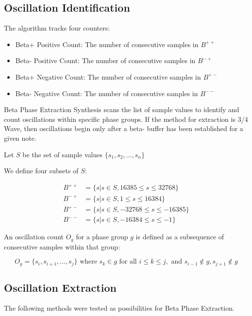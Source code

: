 \documentclass[12pt,a4paper]{article}
\begin{document}
\subsection{Oscillation Identification}
The algorithm tracks four counters:
\begin{itemize}
    \item Beta+ Positive Count: The number of consecutive samples in $B^{++}$
    \item Beta- Positive Count: The number of consecutive samples in $B^{-+}$
    \item Beta+ Negative Count: The number of consecutive samples in $B^{+-}$
    \item Beta- Negative Count: The number of consecutive samples in $B^{--}$
\end{itemize}
Beta Phase Extraction Synthesis scans the list of sample values to identify and count oscillations within specific phase groups. If the method for extraction is 3/4 Wave, then oscillations begin only after a beta- buffer has been established for a given note.

Let $S$ be the set of sample values $\{s_1, s_2, ..., s_n\}$

We define four subsets of $S$:

\begin{align*}
B^{++} &= \{s | s \in S, 16385 \leq s \leq 32768\} \\
B^{-+} &= \{s | s \in S, 1 \leq s \leq 16384\} \\
B^{+-} &= \{s | s \in S, -32768 \leq s \leq -16385\} \\
B^{--} &= \{s | s \in S, -16384 \leq s \leq -1\}
\end{align*}

An oscillation count $O_g$ for a phase group $g$ is defined as a subsequence of consecutive samples within that group:

\begin{equation*}
O_g = \{s_i, s_{i+1}, ..., s_j\} \text{ where } s_k \in g \text{ for all } i \leq k \leq j, \text{ and } s_{i-1} \notin g, s_{j+1} \notin g
\end{equation*}



\subsection{Oscillation Extraction}
The following methods were tested as possibilities for Beta Phase Extraction.
\end{document}

